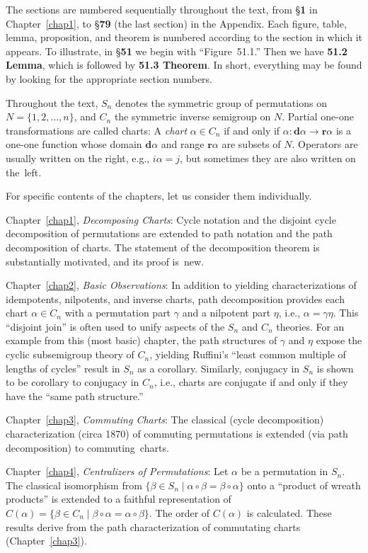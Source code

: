 \documentclass{surv-l}
\numberwithin{equation}{section}
\numberwithin{table}{section}
\numberwithin{figure}{section}
\theoremstyle{definition}
\begin{document}
The sections are numbered sequentially throughout the text, from
\S\textbf{1} in Chapter~\ref{chap1}, to \S\textbf{79} (the
last section) in the Appendix. Each figure, table, lemma,
proposition, and theorem is numbered according to the section in
which it appears. To illustrate, in \S\textbf{51} we begin with
``Figure~51.1.'' Then we have \textbf{51.2 Lemma},
which is followed by \textbf{51.3 Theorem}. In short,
everything may be found by looking for the appropriate section
numbers.

Throughout the text, $S_{n}$ denotes the symmetric group of
permutations on $N=\{1,2,\ldots, n\}$, and $C_{n}$ the symmetric
inverse semigroup on $N$. Partial one-one transformations are called
charts: A \emph{chart} $\alpha\in C_{n}$ if and only if $\alpha :
\mathbf{d}\alpha\rightarrow \mathbf{r}\alpha$ is a one-one
function whose domain $\mathbf{d}\alpha$ and range
$\mathbf{r}\alpha$ are subsets of $N$. Operators are usually
written on the right, e.g., $i\alpha=j$, but sometimes they are
also written on the~left.

For specific contents of the chapters, let us consider them individually.

Chapter~\ref{chap1}, \emph{Decomposing Charts}: Cycle notation and
the disjoint cycle decomposition of permutations are extended to
path notation and the path decomposition of charts. The statement
of the decomposition theorem is substantially motivated, and its
proof is~new.

Chapter~\ref{chap2}, \emph{Basic Observations}: In addition to
yielding characterizations of idempotents, nilpotents, and inverse
charts, path decomposition provides each chart $\alpha\in C_{n}$
with a permutation part $\gamma$ and a nilpotent part $\eta$,
i.e., $\alpha=\gamma\eta$. This ``disjoint join'' is often used to
unify aspects of the $S_{n}$ and $C_{n}$ theories. For an example
from this (most basic) chapter, the path structures of $\gamma$
and $\eta$ expose the cyclic subsemigroup theory of $C_{n}$,
yielding Ruffini's ``least common multiple of lengths of cycles''
result in $S_{n}$ as a corollary. Similarly, conjugacy in $S_{n}$
is shown to be corollary to conjugacy in $C_{n}$, i.e., charts are
conjugate if and only if they have the ``same path structure.''

Chapter~\ref{chap3}, \emph{Commuting Charts}: The classical (cycle
decomposition) characterization (circa 1870) of commuting
permutations is extended (via path decomposition) to
commuting~charts.

Chapter~\ref{chap4}, \emph{Centralizers of
Permutations}: Let $\alpha$ be a permutation
in $S_{n}$. The classical isomorphism from $\{\beta\in
S_{n}\mid \alpha \circ \beta=\beta \circ \alpha\}$ onto a
``product of wreath products'' is extended
to a faithful representation of $C(\alpha)=\{\beta\in
C_{n}\mid \beta \circ \alpha=\alpha \circ \beta\}$. The order
of $C(\alpha)$ is calculated. These results derive from the path
characterization of commutating charts (Chapter~\ref{chap3}).
\end{document}
